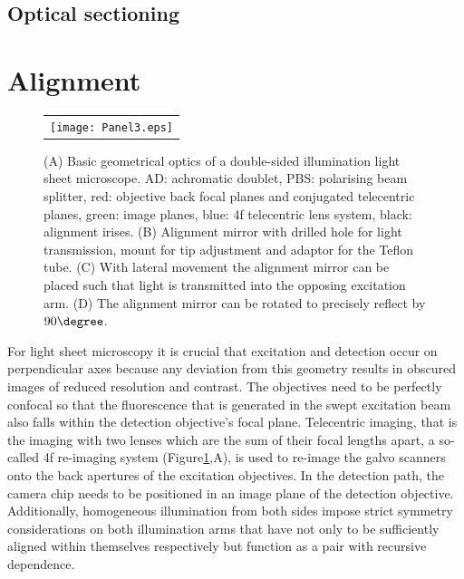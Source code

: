 \documentclass[12pt]{spieman}  %
\begin{document}
	\subsection{Optical sectioning}	
	
\section{Alignment}

\begin{figure}
   \begin{center}
   \begin{tabular}{c}
   \texttt{[image: Panel3.eps]}
   \end{tabular}
   \end{center}
   \caption{\label{fig:alignment} (A) Basic geometrical optics of a double-sided illumination light sheet microscope. AD: achromatic doublet, PBS: polarising beam splitter, red: objective back focal planes and conjugated telecentric planes, green: image planes, blue: 4f telecentric lens system, black: alignment irises. (B) Alignment mirror with drilled hole for light transmission, mount for tip adjustment and adaptor for the Teflon tube. (C) With lateral movement the alignment mirror can be placed such that light is transmitted into the opposing excitation arm. (D) The alignment mirror can be rotated to precisely reflect by $90\degree$.} 
   \end{figure}

For light sheet microscopy it is crucial that excitation and detection occur on perpendicular axes because any deviation from this geometry results in obscured images of reduced resolution and contrast. The objectives need to be perfectly confocal so that the fluorescence that is generated in the swept excitation beam also falls within the detection objective's focal plane. Telecentric imaging, that is the imaging with two lenses which are the sum of their focal lengths apart, a so-called 4f re-imaging system (Figure\ref{fig:alignment},A), is used to re-image the galvo scanners onto the back apertures of the excitation objectives. In the detection path, the camera chip needs to be positioned in an image plane of the detection objective. Additionally, homogeneous illumination from both sides impose strict symmetry considerations on both illumination arms that have not only to be sufficiently aligned within themselves respectively but function as a pair with recursive dependence. 
\end{document}

